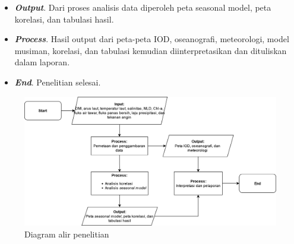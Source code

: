 \begin{spacing}{1.5}
\begin{itemize}
		Tahapan yang dilakukan dalam analisis korelasi dapat dijelaskan sebagai berikut.
		\begin{itemize}
			\item Tentukan hipotesis nol dan hipotesis alternatif.
			\item Tentukan tingkat signifikansi alpha (alpha 1\% atau 5\%).
			\item Hitung koefisien korelasi antara dua variabel.
			\item Hitung nilai p (nilai probabilitas) dari koefisien korelasi untuk menentukan signifikansi statistik.
			\item Bandingkan nilai p dengan tingkat signifikansi $\alpha$. Jika p < $\alpha$, maka korelasi signifikan secara statistik dan hipotesis nol dapat ditolak. Sedangkan jika p > $\alpha$, maka tidak ada bukti yang cukup untuk menolak hipotesis nol dan korelasi dianggap tidak signifikan.
			\item Plot hasil uji korelasi.
		\end{itemize}
		\item \textbf{\textit{Output}}. Dari proses analisis data diperoleh peta seasonal model, peta korelasi, dan tabulasi hasil.
		\item \textbf{\textit{Process}}. Hasil output dari peta-peta IOD, oseanografi, meteorologi, model musiman, korelasi, dan tabulasi kemudian diinterpretasikan dan dituliskan dalam laporan.
		\item \textbf{\textit{End}}. Penelitian selesai.
	\end{itemize}
	\begin{figure}[H]
		\centering
		\includegraphics[width=14cm]{contents/Figures/Flowchart_Diagram.png}
		\caption{Diagram alir penelitian}
		\label{fig:flowchart}
	\end{figure}
\end{spacing}

